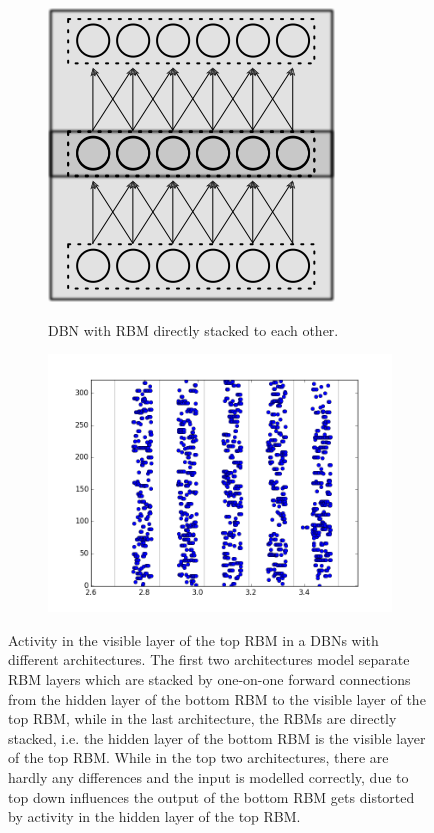 \begin{figure}[h!]
	
	\begin{subfigure}[t]{.49\textwidth}
  		\centering
  		\includegraphics[width=.50\linewidth]{imgs/app/dbn_np_arch.png}
  		\label{fig:sub1}
  		 \caption{DBN with RBM directly stacked to each other.}
	\end{subfigure}%
	\begin{subfigure}[t]{.49\textwidth}
  		\centering
  		\includegraphics[width=.9\linewidth]{imgs/app/DBN_np_sp.png}
  		\label{fig:sub2}
	\end{subfigure}
	\caption[Activity in the visible layer of the top RBM in a DBNs with different architectures.]{Activity in the visible layer of the top RBM in a DBNs with different architectures. The first two architectures model separate RBM layers which are stacked by one-on-one forward connections from the hidden layer of the bottom RBM to the visible layer of the top RBM, while in the last architecture, the RBMs are directly stacked, i.e. the hidden layer of the bottom RBM is the visible layer of the top RBM. While in the top two architectures, there are hardly any differences and the input is modelled correctly, due to top down influences the output of the bottom RBM gets distorted by activity in the hidden layer of the top RBM.}
	\label{fig:spikingdbnarch}
\end{figure}

